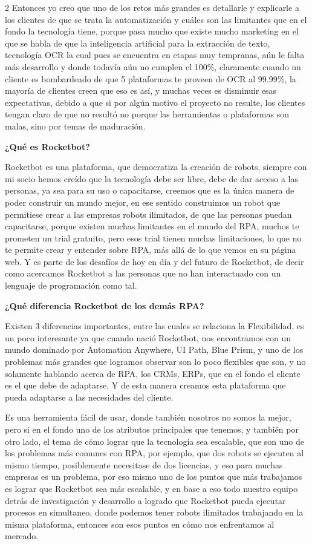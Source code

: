 \documentclass[12pt,spanish,Letterpaper,openany]{book}
\begin{document}
\begin {multicols}{2}
Entonces yo creo que uno de los retos más grandes es detallarle y explicarle a los clientes de que se trata la automatización y cuáles son las limitantes que en el fondo la tecnología tiene, porque pasa mucho que existe mucho marketing en el que se habla de que la inteligencia artificial para la extracción de texto, tecnología OCR la cual pues se encuentra en etapas muy tempranas, aún le falta más desarrollo y donde todavía aún no cumplen el 100\%, claramente cuando un cliente es bombardeado de que 5 plataformas te proveen de OCR al 99.99\%, la mayoría de clientes creen que eso es así, y muchas veces es disminuir esas expectativas, debido a que si por algún motivo el proyecto no resulte, los clientes tengan claro de que no resultó no porque las herramientas o plataformas son malas, sino por temas de maduración.

\textbf{¿Qué es Rocketbot?}

Rocketbot es una plataforma, que democratiza la creación de robots, siempre con mi socio hemos creído que la tecnología debe ser libre, debe de dar acceso a las personas, ya sea para su uso o capacitarse, creemos que es la única manera de poder construir un mundo mejor, en ese sentido construimos un robot que permitiese crear a las empresas robots ilimitados, de que las personas puedan capacitarse, porque existen muchas limitantes en el mundo del RPA, muchos te prometen un trial gratuito, pero esos trial tienen muchas limitaciones, lo que no te permite crear y entender sobre RPA, más allá de lo que vemos en su página web.
Y es parte de los desafíos de hoy en día y del futuro de Rocketbot, de decir como acercamos Rocketbot a las personas que no han interactuado con un lenguaje de programación como tal.

\textbf{¿Qué diferencia Rocketbot de los demás RPA?}

Existen 3 diferencias importantes, entre las cuales se relaciona la Flexibilidad, es un poco interesante ya que cuando nació Rocketbot, nos encontramos con un mundo dominado por Automation Anywhere, UI Path, Blue Prism, y uno de los problemas más grandes que logramos observar son lo poco flexibles que son, y no solamente hablando acerca de RPA, los CRMs, ERPs, que en el fondo el cliente es el que debe de adaptarse. Y de esta manera creamos esta plataforma que pueda adaptarse a las necesidades del cliente.

Es una herramienta fácil de usar, donde también nosotros no somos la mejor, pero si en el fondo uno de los atributos principales que tenemos, y también por otro lado, el tema de cómo lograr que la tecnología sea escalable, que son uno de los problemas más comunes con RPA, por ejemplo, que dos robots se ejecuten al mismo tiempo, posiblemente necesitase de dos licencias, y eso para muchas empresas es un problema, por eso mismo uno de los puntos que más trabajamos es lograr que Rocketbot sea más escalable, y en base a eso todo nuestro equipo detrás de investigación y desarrollo a logrado que Rocketbot pueda ejecutar procesos en simultaneo, donde podemos tener robots ilimitados trabajando en la misma plataforma, entonces son esos puntos en cómo nos enfrentamos al mercado.


\end{multicols}
\end{document}
